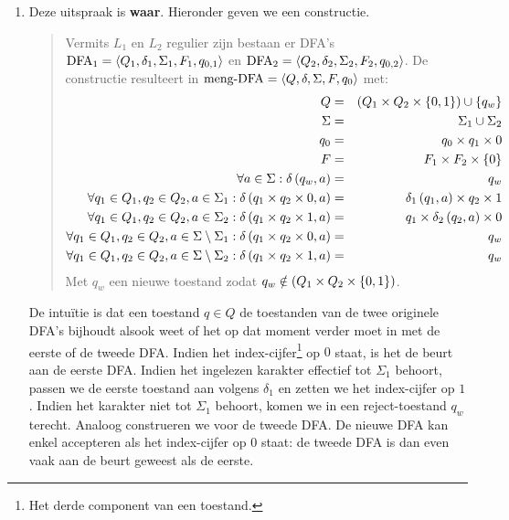\documentclass{article}
\begin{document}
\begin{question}
\begin{answer}
\begin{enumerate}
\begin{quote}
\begin{proof}
\begin{enumerate}
 \end{enumerate}
 Bijgevolg is $L^{\star}=\epsilon|aaa^{\star}$
 \end{proof}
 \end{quote}
 \item Deze uitspraak is \textbf{waar}. Hieronder geven we een constructie.
 \begin{quote}
 \begin{construction}
 Vermits $L_1$ en $L_2$ regulier zijn bestaan er DFA's $\mbox{DFA}_1=\left\langle Q_1,\delta_1,\Sigma_1,F_1,q_{0,1} \right\rangle$ en $\mbox{DFA}_2=\left\langle Q_2,\delta_2,\Sigma_2,F_2,q_{0,2} \right\rangle$. De constructie resulteert in $\mbox{meng-DFA}=\left\langle Q,\delta,\Sigma,F,q_0 \right\rangle$ met:
 \begin{eqnarray}
  Q&=&\left( Q_1\times Q_2\times\left\{ 0,1 \right\} \right)\cup\left\{ q_w \right\}\\
  \Sigma&=&\Sigma_1\cup\Sigma_2\\
  q_0&=&q_0\times q_1\times 0\\
  F&=&F_1\times F_2\times\left\{ 0 \right\}\\
  \forall a\in \Sigma:\delta\left( q_w,a \right)&=&q_w\\
  \forall q_1\in Q_1,q_2\in Q_2,a\in \Sigma_1:\delta\left( q_1\times q_2\times 0,a \right)&=&\delta_1\left( q_1,a \right)\times q_2\times 1\\
  \forall q_1\in Q_1,q_2\in Q_2,a\in \Sigma_2:\delta\left( q_1\times q_2\times 1,a \right)&=&q_1\times\delta_2\left( q_2,a \right)\times 0\\
  \forall q_1\in Q_1,q_2\in Q_2,a\in \Sigma\setminus\Sigma_1:\delta\left( q_1\times q_2\times 0,a \right)&=&q_w\\
  \forall q_1\in Q_1,q_2\in Q_2,a\in \Sigma\setminus\Sigma_2:\delta\left( q_1\times q_2\times 1,a \right)&=&q_w
 \end{eqnarray}
 Met $q_w$ een nieuwe toestand zodat $q_w\notin\left( Q_1\times Q_2\times\left\{ 0,1 \right\} \right)$.
 \end{construction}
 \end{quote}
 De intu\"itie is dat een toestand $q\in Q$ de toestanden van de twee originele DFA's bijhoudt alsook weet of het op dat moment verder moet in met de eerste of de tweede DFA. Indien het index-cijfer\footnote{Het derde component van een toestand.} op $0$ staat, is het de beurt aan de eerste DFA. Indien het ingelezen karakter effectief tot $\Sigma_1$ behoort, passen we de eerste toestand aan volgens $\delta_1$ en zetten we het index-cijfer op $1$. Indien het karakter niet tot $\Sigma_1$ behoort, komen we in een reject-toestand $q_w$ terecht. Analoog construeren we voor de tweede DFA. De nieuwe DFA kan enkel accepteren als het index-cijfer op $0$ staat: de tweede DFA is dan even vaak aan de beurt geweest als de eerste.
\end{enumerate}
\end{answer}
\end{question}
\end{document}
